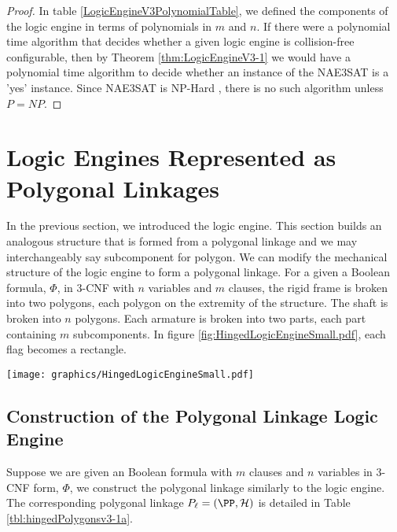 \documentclass[10pt]{CSUNthesis}
\theoremstyle{plain}%
\theoremstyle{definition}
\theoremstyle{remark}
\newcommand{\HH}{{\mathcal{H}}} %
\begin{document}
\begin{proof}
In table \ref{LogicEngineV3PolynomialTable}, we defined the components of the logic engine in terms of polynomials in $m$ and $n$. 
If there were a polynomial time algorithm that decides whether a given logic engine is collision-free configurable, then by Theorem \ref{thm:LogicEngineV3-1} we would have a polynomial time algorithm to decide whether an instance of the NAE3SAT is a 'yes' instance.  
Since NAE3SAT is NP-Hard \cite{NAE3SATisNPhard}, there is no such algorithm unless $P = NP$.
\end{proof}\section{Logic Engines Represented as Polygonal Linkages}   
In the previous section, we introduced the logic engine.  
This section builds an analogous structure that is formed from a polygonal linkage and we may interchangeably say subcomponent for polygon.
We can modify the mechanical structure of the logic engine to form a polygonal linkage.  
For a given a Boolean formula, $\Phi$, in 3-CNF with $n$ variables and $m$ clauses,
the rigid frame is broken into two polygons, each polygon on the extremity of the structure.
The shaft is broken into $n$ polygons.
Each armature is broken into two parts, each part containing $m$ subcomponents.
In figure \ref{fig:HingedLogicEngineSmall.pdf}, each flag becomes a rectangle.

\begin{minipage}{\linewidth}
\begin{center}
\texttt{[image: graphics/HingedLogicEngineSmall.pdf]}
\label{fig:HingedLogicEngineSmall.pdf}
\end{center}
\end{minipage}

\subsection{Construction of the Polygonal Linkage Logic Engine}
Suppose we are given an Boolean formula with $m$ clauses and $n$ variables in 3-CNF form, $\Phi$, we construct the polygonal linkage similarly to the logic engine.
The corresponding polygonal linkage $P_\ell = (\PP,\HH)$ is detailed in Table \ref{tbl:hingedPolygonsv3-1a}.
\end{document}

